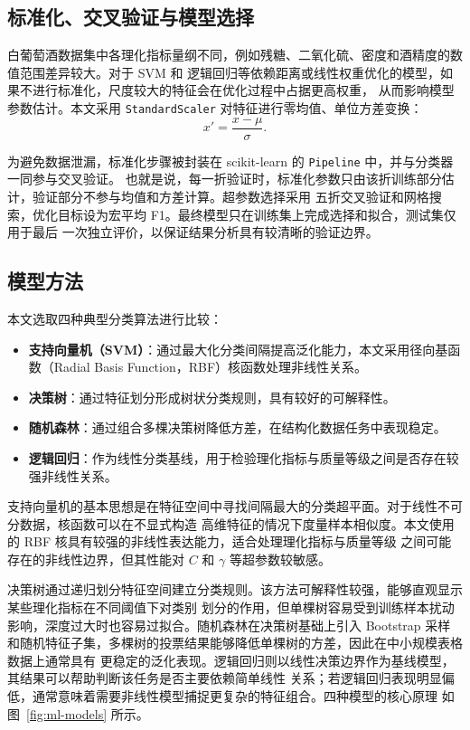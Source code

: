 \documentclass[12pt,a4paper,fontset=fandol]{ctexart}
\numberwithin{figure}{section}
\numberwithin{table}{section}
\numberwithin{equation}{section}
\begin{document}
\subsection{标准化、交叉验证与模型选择}
白葡萄酒数据集中各理化指标量纲不同，例如残糖、二氧化硫、密度和酒精度的数值范围差异较大。对于 SVM 和
逻辑回归等依赖距离或线性权重优化的模型，如果不进行标准化，尺度较大的特征会在优化过程中占据更高权重，
从而影响模型参数估计。本文采用 \texttt{StandardScaler} 对特征进行零均值、单位方差变换：
\begin{equation}
x'=\frac{x-\mu}{\sigma}.
\end{equation}

为避免数据泄漏，标准化步骤被封装在 scikit-learn 的 \texttt{Pipeline} 中，并与分类器一同参与交叉验证。
也就是说，每一折验证时，标准化参数只由该折训练部分估计，验证部分不参与均值和方差计算。超参数选择采用
五折交叉验证和网格搜索，优化目标设为宏平均 F1。最终模型只在训练集上完成选择和拟合，测试集仅用于最后
一次独立评价，以保证结果分析具有较清晰的验证边界。

\subsection{模型方法}
本文选取四种典型分类算法进行比较：
\begin{itemize}[leftmargin=2.2em]
  \item \textbf{支持向量机（SVM）}：通过最大化分类间隔提高泛化能力，本文采用径向基函数（Radial Basis Function，RBF）核函数处理非线性关系。
  \item \textbf{决策树}：通过特征划分形成树状分类规则，具有较好的可解释性。
  \item \textbf{随机森林}：通过组合多棵决策树降低方差，在结构化数据任务中表现稳定。
  \item \textbf{逻辑回归}：作为线性分类基线，用于检验理化指标与质量等级之间是否存在较强非线性关系。
\end{itemize}

支持向量机的基本思想是在特征空间中寻找间隔最大的分类超平面。对于线性不可分数据，核函数可以在不显式构造
高维特征的情况下度量样本相似度。本文使用的 RBF 核具有较强的非线性表达能力，适合处理理化指标与质量等级
之间可能存在的非线性边界，但其性能对 $C$ 和 $\gamma$ 等超参数较敏感。

决策树通过递归划分特征空间建立分类规则。该方法可解释性较强，能够直观显示某些理化指标在不同阈值下对类别
划分的作用，但单棵树容易受到训练样本扰动影响，深度过大时也容易过拟合。随机森林在决策树基础上引入
Bootstrap 采样和随机特征子集，多棵树的投票结果能够降低单棵树的方差，因此在中小规模表格数据上通常具有
更稳定的泛化表现。逻辑回归则以线性决策边界作为基线模型，其结果可以帮助判断该任务是否主要依赖简单线性
关系；若逻辑回归表现明显偏低，通常意味着需要非线性模型捕捉更复杂的特征组合。四种模型的核心原理
如图~\ref{fig:ml-models} 所示。
\end{document}
